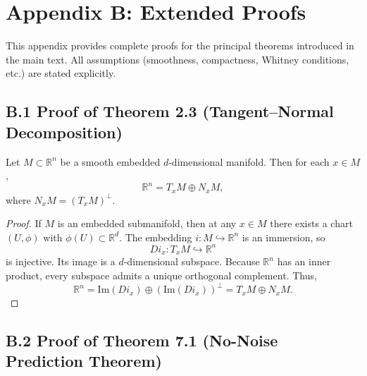 \documentclass[11pt,a4paper,twocolumn]{article}
\begin{document}

\section*{Appendix B: Extended Proofs}

This appendix provides complete proofs for the principal theorems
introduced in the main text.
All assumptions (smoothness, compactness, Whitney conditions, etc.)
are stated explicitly.


\subsection*{B.1 Proof of Theorem 2.3 (Tangent–Normal Decomposition)}

\begin{theorem*}
Let $M \subset \mathbb{R}^n$ be a smooth embedded $d$-dimensional manifold.
Then for each $x \in M$,
\[
\mathbb{R}^n = T_x M \oplus N_x M,
\]
where $N_x M = (T_xM)^\perp$.
\end{theorem*}

\begin{proof}
If $M$ is an embedded submanifold, then at any $x \in M$ there exists a
chart $(U,\phi)$ with $\phi(U) \subset \mathbb{R}^d$.
The embedding $i: M \hookrightarrow \mathbb{R}^n$ is an immersion, so
\[
D i_x : T_x M \hookrightarrow \mathbb{R}^n
\]
is injective. Its image is a $d$-dimensional subspace.
Because $\mathbb{R}^n$ has an inner product, every subspace admits a
unique orthogonal complement. Thus,
\[
\mathbb{R}^n = \mathrm{Im}(D i_x) \oplus (\mathrm{Im}(D i_x))^\perp
= T_x M \oplus N_x M.
\]
\end{proof}


\subsection*{B.2 Proof of Theorem 7.1 (No-Noise Prediction Theorem)}
\end{document}
